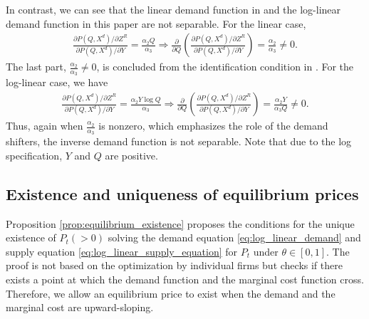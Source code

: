 \documentclass[11pt, a4paper]{article}
\theoremstyle{remark}
\begin{document}
In contrast, we can see that the linear demand function in \citet{bresnahan1982oligopoly} and the log-linear demand function in this paper are not separable.
For the linear case,
\begin{align}
    \frac{\partial P(Q, X^{d})/\partial Z^{R}}{\partial P(Q, X^{d})/\partial Y} = \frac{ \alpha_2 Q}{\alpha_3} \Longrightarrow \frac{\partial}{\partial Q}\left(\frac{\partial P(Q, X^{d})/\partial Z^{R}}{\partial P(Q, X^{d})/\partial Y}\right) = \frac{\alpha_2}{\alpha_3} \ne 0.
\end{align}
The last part, $\frac{\alpha_2}{\alpha_3} \ne 0$, is concluded from the identification condition in \citet{matsumura2023resolving}.
For the log-linear case, we have
\begin{align}
    \frac{\partial P(Q, X^{d})/\partial Z^{R}}{\partial P(Q, X^{d})/\partial Y}  = \frac{\alpha_2 Y \log Q}{\alpha_3} \Longrightarrow \frac{\partial}{\partial Q}\left(\frac{\partial P(Q, X^{d})/\partial Z^{R}}{\partial P(Q, X^{d})/\partial Y}\right) = \frac{\alpha_2Y}{\alpha_3Q} \ne 0.
\end{align}
Thus, again when $\frac{\alpha_2}{\alpha_3}$ is nonzero, which emphasizes the role of the demand shifters,  the inverse demand function is not separable.
Note that due to the log specification, $Y$ and $Q$ are positive.

















\subsection{Existence and uniqueness of equilibrium prices}\label{sec:appendix_proof}

Proposition \ref{prop:equilibrium_existence} proposes the conditions for the unique existence of $P_{t}(>0)$ solving the demand equation \eqref{eq:log_linear_demand} and supply equation \eqref{eq:log_linear_supply_equation} for $P_{t}$ under $\theta\in[0,1]$.
The proof is not based on the optimization by individual firms but checks if there exists a point at which the demand function and the marginal cost function cross.
Therefore, we allow an equilibrium price to exist when the demand and the marginal cost are upward-sloping.
    
\end{document}
